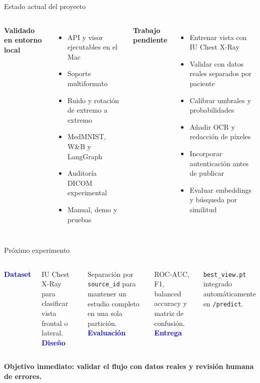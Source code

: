 \documentclass[aspectratio=169,10pt]{beamer}
\newcommand{\bigpoint}[2]{\textcolor{Blue}{\Large\bfseries #1}\par\smallskip #2}
\begin{document}
\begin{frame}{Estado actual del proyecto}
\begin{columns}[T,onlytextwidth]
{\bfseries\color{Blue}Validado en entorno local}
\begin{itemize}
  \item API y visor ejecutables en el Mac
  \item Soporte multiformato
  \item Ruido y rotación de extremo a extremo
  \item MedMNIST, W\&B y LangGraph
  \item Auditoría DICOM experimental
  \item Manual, demo y pruebas
\end{itemize}
{\bfseries\color{Coral}Trabajo pendiente}
\begin{itemize}
  \item Entrenar vista con IU Chest X-Ray
  \item Validar con datos reales separados por paciente
  \item Calibrar umbrales y probabilidades
  \item Añadir OCR y redacción de píxeles
  \item Incorporar autenticación antes de publicar
  \item Evaluar embeddings y búsqueda por similitud
\end{itemize}
\end{columns}
\end{frame}

\begin{frame}{Próximo experimento}
\begin{columns}[T,onlytextwidth]
\bigpoint{Dataset}{IU Chest X-Ray para clasificar vista frontal o lateral.}
\vspace{0.45cm}
\bigpoint{Diseño}{Separación por \texttt{source\_id} para mantener un estudio completo en una sola partición.}
\bigpoint{Evaluación}{ROC-AUC, F1, balanced accuracy y matriz de confusión.}
\vspace{0.45cm}
\bigpoint{Entrega}{\texttt{best\_view.pt} integrado automáticamente en \texttt{/predict}.}
\end{columns}
\vspace{0.75cm}
\centering
{\large\color{Navy}\bfseries Objetivo inmediato: validar el flujo con datos reales y revisión humana de errores.}
\end{frame}
\end{document}
